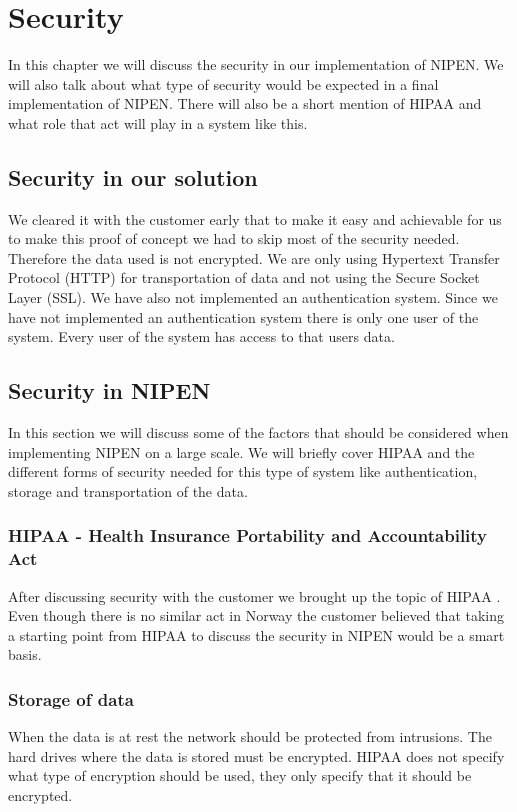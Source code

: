 \chapter{Security} 
\label{ch:security}


In this chapter we will discuss the security in our implementation of NIPEN.
We will also talk about what type of security would be expected in a final implementation of NIPEN. There will also be a short mention of HIPAA and what role that act will play in a system like this.

\section{Security in our solution}
We cleared it with the customer early that to make it easy and achievable for us to make this proof of concept we had to skip most of the security needed.
Therefore the data used is not encrypted. 
We are only using Hypertext Transfer Protocol (HTTP) for transportation of data and not using the Secure Socket Layer (SSL).  
We have also not implemented an authentication system.
Since we have not implemented an authentication system there is only one user of the system.
Every user of the system has access to that users data.

\section{Security in NIPEN}

In this section we will discuss some of the factors that should be considered when implementing NIPEN on a large scale.
We will briefly cover HIPAA and the different forms of security needed for this type of system like authentication, storage and transportation of the data.


\subsection{HIPAA - Health Insurance Portability and Accountability Act}

After discussing security with the customer we brought up the topic of HIPAA \cite{HIPAA}. 
Even though there is no similar act in Norway the customer believed that taking a starting point from HIPAA to discuss the security in NIPEN would be a smart basis. 

\subsection{Storage of data}
When the data is at rest the network should be protected from intrusions.
The hard drives where the data is stored must be encrypted. \cite{Encryption}
HIPAA does not specify what type of encryption should be used, they only specify that it should be encrypted.

